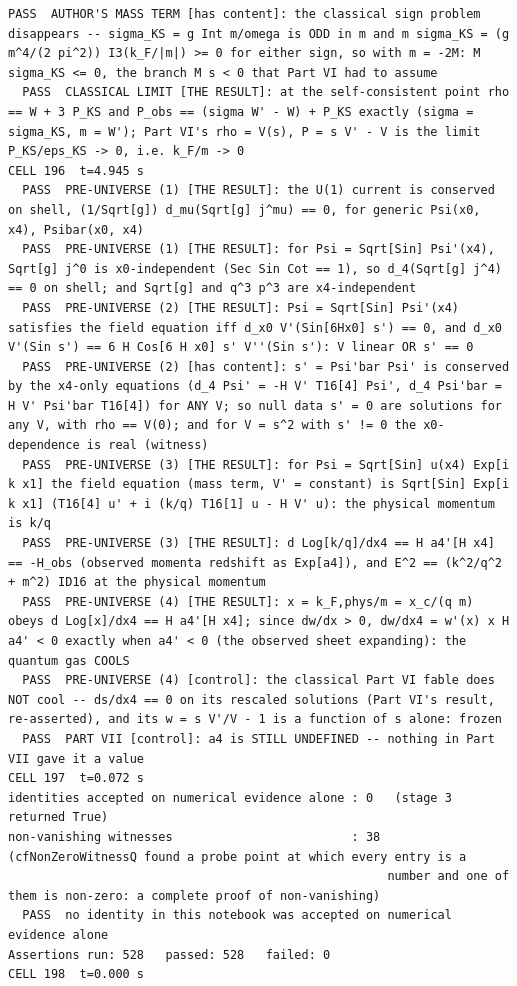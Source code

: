 \begin{Verbatim}[fontsize=\scriptsize]
  PASS  AUTHOR'S MASS TERM [has content]: the classical sign problem disappears -- sigma_KS = g Int m/omega is ODD in m and m sigma_KS = (g m^4/(2 pi^2)) I3(k_F/|m|) >= 0 for either sign, so with m = -2M: M sigma_KS <= 0, the branch M s < 0 that Part VI had to assume
  PASS  CLASSICAL LIMIT [THE RESULT]: at the self-consistent point rho == W + 3 P_KS and P_obs == (sigma W' - W) + P_KS exactly (sigma = sigma_KS, m = W'); Part VI's rho = V(s), P = s V' - V is the limit P_KS/eps_KS -> 0, i.e. k_F/m -> 0
CELL 196  t=4.945 s
  PASS  PRE-UNIVERSE (1) [THE RESULT]: the U(1) current is conserved on shell, (1/Sqrt[g]) d_mu(Sqrt[g] j^mu) == 0, for generic Psi(x0, x4), Psibar(x0, x4)
  PASS  PRE-UNIVERSE (1) [THE RESULT]: for Psi = Sqrt[Sin] Psi'(x4), Sqrt[g] j^0 is x0-independent (Sec Sin Cot == 1), so d_4(Sqrt[g] j^4) == 0 on shell; and Sqrt[g] and q^3 p^3 are x4-independent
  PASS  PRE-UNIVERSE (2) [THE RESULT]: Psi = Sqrt[Sin] Psi'(x4) satisfies the field equation iff d_x0 V'(Sin[6Hx0] s') == 0, and d_x0 V'(Sin s') == 6 H Cos[6 H x0] s' V''(Sin s'): V linear OR s' == 0
  PASS  PRE-UNIVERSE (2) [has content]: s' = Psi'bar Psi' is conserved by the x4-only equations (d_4 Psi' = -H V' T16[4] Psi', d_4 Psi'bar = H V' Psi'bar T16[4]) for ANY V; so null data s' = 0 are solutions for any V, with rho == V(0); and for V = s^2 with s' != 0 the x0-dependence is real (witness)
  PASS  PRE-UNIVERSE (3) [THE RESULT]: for Psi = Sqrt[Sin] u(x4) Exp[i k x1] the field equation (mass term, V' = constant) is Sqrt[Sin] Exp[i k x1] (T16[4] u' + i (k/q) T16[1] u - H V' u): the physical momentum is k/q
  PASS  PRE-UNIVERSE (3) [THE RESULT]: d Log[k/q]/dx4 == H a4'[H x4] == -H_obs (observed momenta redshift as Exp[a4]), and E^2 == (k^2/q^2 + m^2) ID16 at the physical momentum
  PASS  PRE-UNIVERSE (4) [THE RESULT]: x = k_F,phys/m = x_c/(q m) obeys d Log[x]/dx4 == H a4'[H x4]; since dw/dx > 0, dw/dx4 = w'(x) x H a4' < 0 exactly when a4' < 0 (the observed sheet expanding): the quantum gas COOLS
  PASS  PRE-UNIVERSE (4) [control]: the classical Part VI fable does NOT cool -- ds/dx4 == 0 on its rescaled solutions (Part VI's result, re-asserted), and its w = s V'/V - 1 is a function of s alone: frozen
  PASS  PART VII [control]: a4 is STILL UNDEFINED -- nothing in Part VII gave it a value
CELL 197  t=0.072 s
identities accepted on numerical evidence alone : 0   (stage 3 returned True)
non-vanishing witnesses                         : 38   (cfNonZeroWitnessQ found a probe point at which every entry is a
                                                     number and one of them is non-zero: a complete proof of non-vanishing)
  PASS  no identity in this notebook was accepted on numerical evidence alone
Assertions run: 528   passed: 528   failed: 0
CELL 198  t=0.000 s
\end{Verbatim}

